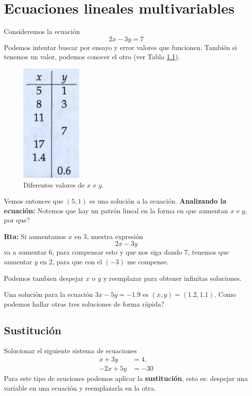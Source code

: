 \chapter{Ecuaciones lineales multivariables}\label{chapter:ecuacionesLinealesMultivaribles}

\begin{ejemplo}
	Consideremos la ecuación 
	\[
	2x-3y = 7
	\]
	Podemos intentar buscar por ensayo y error valores que funcionen. También si tenemos un valor, podemos conocer el otro (ver Tabla \ref{fig:tablaxey}).
	\begin{figure}[h]
		\centering
		\includegraphics[width=0.2\linewidth]{Algebra/imgs/TablaProblemap105}
		\caption{Diferentes valores de $x$ e $y$.}
		\label{fig:tablaxey}
	\end{figure}
	Vemos entonces que $(5,1)$ es una solución a la ecuación. \textbf{Analizando la ecuación:} Notemos que hay un patrón lineal en la forma en que aumentan $x$ e $y$, por que?
	
	\textbf{Rta:} Si aumentamos $x$ en 3, nuestra expresión
	\[
	2x-3y
	\]
	va a aumentar 6, para compensar esto y que nos siga dando 7, tenemos que aumentar $y$ en 2, para que con el $(-3)$ me compense.
	
	Podemos tambien despejar $x$ o $y$ y reemplazar para obtener infinitas soluciones.
\end{ejemplo}

\begin{exer}
	Una solución para la ecuación $3x-5y=-1.9$ es $(x,y) = (1.2,1.1)$. Como podemos hallar otras tres soluciones de forma rápida?
\end{exer}

\section{Sustitución}\label{section:sustitucion}

\begin{ejemplo}
	Solucionar el siguiente sistema de ecuaciones
	\begin{align*}
	x+3y &= 4, \\
	-2x+5y &= -30
	\end{align*}
	Para este tipo de ecuciones podemos aplicar la \textbf{sustitución}, esto es: despejar una variable en una ecuación y reemplazarla en la otra.
\end{ejemplo}


